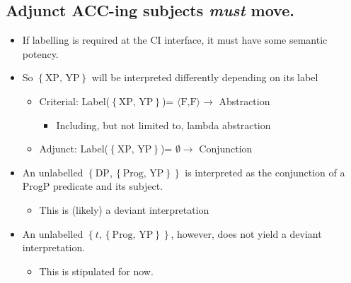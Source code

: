 \documentclass[letterpaper]{article}
\begin{document}
\subsection{Adjunct ACC-ing subjects \textit{must} move.}
\begin{itemize}
  \item If labelling is required at the CI interface, it must have some semantic potency.
  \item So $\left\{ \text{XP, YP} \right\}$ will be interpreted differently depending on its label
    \begin{itemize}
      \item Criterial: Label($\left\{ \text{XP, YP} \right\}$)= $\langle\text{F,F}\rangle \rightarrow$ Abstraction
	      \begin{itemize}
		\item Including, but not limited to, lambda abstraction \parencite[cp][]{lohndal2011interrogatives}
	      \end{itemize}
      \item Adjunct: Label($\left\{ \text{XP, YP} \right\}$)= $\emptyset \rightarrow$ Conjunction
    \end{itemize}
    \item An unlabelled $\left\{ \text{DP}, \left\{ \text{Prog, YP} \right\} \right\}$ is interpreted as the conjunction of a ProgP predicate and its subject.
	    \begin{itemize}
		    \item This is (likely) a deviant interpretation
	    \end{itemize}
    \item An unlabelled $\left\{ t, \left\{ \text{Prog, YP} \right\} \right\}$, however, does not yield a deviant interpretation.
      \begin{itemize}
	\item This is stipulated for now.
      \end{itemize}
\end{itemize}
\end{document}
